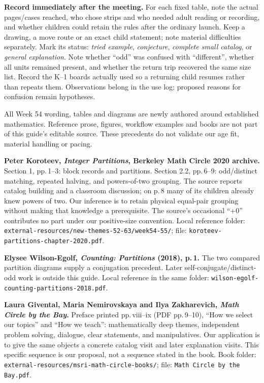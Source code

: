 \documentclass[letterpaper,11pt]{article}
\newcommand{\heading}[1]{\vspace{4pt}{\large\bfseries #1}\par}
\begin{document}
\textbf{Record immediately after the meeting.} For each fixed table, note the actual pages/cases reached, who chose strips and who needed adult reading or recording, and whether children could retain the rules after the ordinary launch. Keep a drawing, a move route or an exact child statement; note material difficulties separately. Mark its status: \emph{tried example}, \emph{conjecture}, \emph{complete small catalog}, or \emph{general explanation}. Note whether ``odd'' was confused with ``different'', whether all units remained present, and whether the return trip recovered the same size list. Record the K--1 boards actually used so a returning child resumes rather than repeats them. Observations belong in the use log; proposed reasons for confusion remain hypotheses.

\heading{Mathematical and teaching precedents}
All Week 54 wording, tables and diagrams are newly authored around established mathematics. Reference prose, figures, workflow examples and books are not part of this guide's editable source. These precedents do not validate our age fit, material handling or pacing.

\textbf{Peter Koroteev, \emph{Integer Partitions}, Berkeley Math Circle 2020 archive.} Section 1, pp.\,1--3: block records and partitions. Section 2.2, pp.\,6--9: odd/distinct matching, repeated halving, and powers-of-two grouping. The source reports catalog building and a classroom discussion; on p.\,8 many of its children already knew powers of two. Our inference is to retain physical equal-pair grouping without making that knowledge a prerequisite. The source's occasional ``+0'' contributes no part under our positive-size convention. Local reference folder: \nolinkurl{external-resources/new-themes-52-63/week54-55/}; file: \nolinkurl{koroteev-partitions-chapter-2020.pdf}.

\textbf{Elysee Wilson-Egolf, \emph{Counting: Partitions} (2018), p.\,1.} The two compared partition diagrams supply a conjugation precedent. Later self-conjugate/distinct-odd work is outside this guide. Local reference in the same folder: \nolinkurl{wilson-egolf-counting-partitions-2018.pdf}.

\textbf{Laura Givental, Maria Nemirovskaya and Ilya Zakharevich, \emph{Math Circle by the Bay}.} Preface printed pp.\,viii--ix (PDF pp.\,9--10), ``How we select our topics'' and ``How we teach'': mathematically deep themes, independent problem solving, dialogue, clear statements, and manipulatives. Our application is to give the same objects a concrete catalog visit and later explanation visits. This specific sequence is our proposal, not a sequence stated in the book. Book folder: \nolinkurl{external-resources/msri-math-circle-books/}; file: \texttt{Math Circle by the Bay.pdf}.
\end{document}
